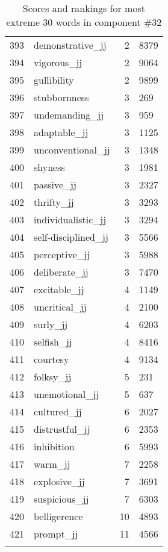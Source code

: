 \begin{longtable}[!htbp]{| rlr@{.}l |}
    393 & demonstrative\_jj & 2 & 8379 \\
    394 & vigorous\_jj & 2 & 9064 \\
    395 & gullibility & 2 & 9899 \\
    396 & stubbornness & 3 & 269 \\
    397 & undemanding\_jj & 3 & 959 \\
    398 & adaptable\_jj & 3 & 1125 \\
    399 & unconventional\_jj & 3 & 1348 \\
    400 & shyness & 3 & 1981 \\
    401 & passive\_jj & 3 & 2327 \\
    402 & thrifty\_jj & 3 & 3293 \\
    403 & individualistic\_jj & 3 & 3294 \\
    404 & self-disciplined\_jj & 3 & 5566 \\
    405 & perceptive\_jj & 3 & 5988 \\
    406 & deliberate\_jj & 3 & 7470 \\
    407 & excitable\_jj & 4 & 1149 \\
    408 & uncritical\_jj & 4 & 2100 \\
    409 & surly\_jj & 4 & 6203 \\
    410 & selfish\_jj & 4 & 8416 \\
    411 & courtesy & 4 & 9134 \\
    412 & folksy\_jj & 5 & 231 \\
    413 & unemotional\_jj & 5 & 637 \\
    414 & cultured\_jj & 6 & 2027 \\
    415 & distrustful\_jj & 6 & 2353 \\
    416 & inhibition & 6 & 5993 \\
    417 & warm\_jj & 7 & 2258 \\
    418 & explosive\_jj & 7 & 3691 \\
    419 & suspicious\_jj & 7 & 6303 \\
    420 & belligerence & 10 & 4893 \\
    421 & prompt\_jj & 11 & 4566 \\
    \hline
    \caption{Scores and rankings for most extreme 30 words in component \#32} \\
\end{longtable}
